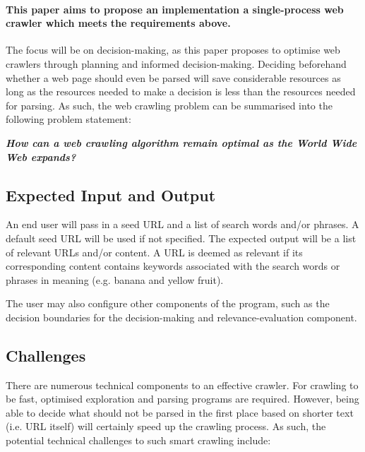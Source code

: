 \documentclass{article}
\begin{document}
\paragraph{This paper aims to propose an implementation a single-process web crawler which meets the requirements above.} The focus will be on decision-making, as this paper proposes to optimise web crawlers through planning and informed decision-making. Deciding beforehand whether a web page should even be parsed will save considerable resources as long as the resources needed to make a decision is less than the resources needed for parsing. As such, the web crawling problem can be summarised into the following problem statement:
\medskip

\textbf{\textit{How can a web crawling algorithm remain optimal as the World Wide Web expands?}}

\subsection{Expected Input and Output}
An end user will pass in a seed URL and a list of search words and/or phrases. A default seed URL will be used if not specified. The expected output will be a list of relevant URLs and/or content. A URL is deemed as relevant if its corresponding content contains keywords associated with the search words or phrases in meaning (e.g. banana and yellow fruit).
\medskip

The user may also configure other components of the program, such as the decision boundaries for the decision-making and relevance-evaluation component.

\subsection{Challenges}
There are numerous technical components to an effective crawler. For crawling to be fast, optimised exploration and parsing programs are required. However, being able to decide what should not be parsed in the first place based on shorter text (i.e. URL itself) will certainly speed up the crawling process. As such, the potential technical challenges to such smart crawling include:
\end{document}
